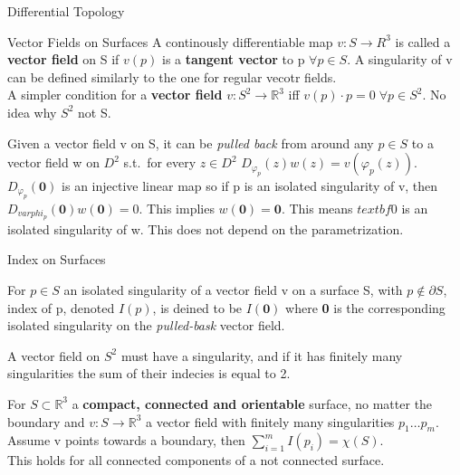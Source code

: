 \documentclass[12pt, letterpaper]{article}
\begin{document}
\begin{section}{Differential Topology}
\begin{subsection}{Vector Fields on Surfaces}
    A continously differentiable map \(v: S \to R^{3}\) is called a \textbf{vector field}
    on S if \(v(p)\) is a \textbf{tangent vector} to p \(\forall p \in S\). A
    singularity of v can be defined similarly to the one for regular vecotr fields. \\
    A simpler condition for a \textbf{vector field} \(v: S^{2} \to \mathbb{R}^{3}\)
    iff \(v(p) \cdot p = 0 \; \forall p \in S^{2}\). No idea why \(S^{2}\) not S.

    Given a vector field v on S, it can be \textit{pulled back} from around any
    \(p \in S\) to a vector field w on \(D^{2}\) s.t.\ for every \(z \in D^{2}\)
    \(D_{\varphi_{p}}(z)w(z) = v(\varphi_{p}(z))\). \\
    \(D_{\varphi_{p}}(\textbf{0})\) is an injective linear map so if p is an
    isolated singularity of v, then \(D_{varphi_{p}}(\textbf{0})w(\textbf{0}) = 0\).
    This implies \(w(\textbf{0}) = \textbf{0}\). This means \(textbf{0}\) is an
    isolated singularity of w. This does not depend on the parametrization.


  \end{subsection}

  \begin{subsection}{Index on Surfaces}

    For \(p \in S\) an isolated singularity of a vector field v on a surface
    S, with \(p \notin \partial S\), index of p, denoted \(I(p)\), is deined to be
    \(I(\textbf{0})\) where \textbf{0} is the corresponding isolated singularity
    on the \textit{pulled-bask} vector field.

    A vector field on \(S^{2}\) must have a singularity, and if it has finitely
    many singularities the sum of their indecies is equal to 2.

    For \(S \subset \mathbb{R}^{3}\) a \textbf{compact, connected and orientable}
    surface, no matter the boundary and \(v: S \to \mathbb{R}^{3}\) a vector
    field with finitely many singularities \(p_{1} \dots p_{m}\). Assume v points
    towards a boundary, then \(\sum^{m}_{i = 1} I(p_{i}) = \chi(S)\). \\
    This holds for all connected components of a not connected surface.

  \end{subsection}

\end{section}
\end{document}
